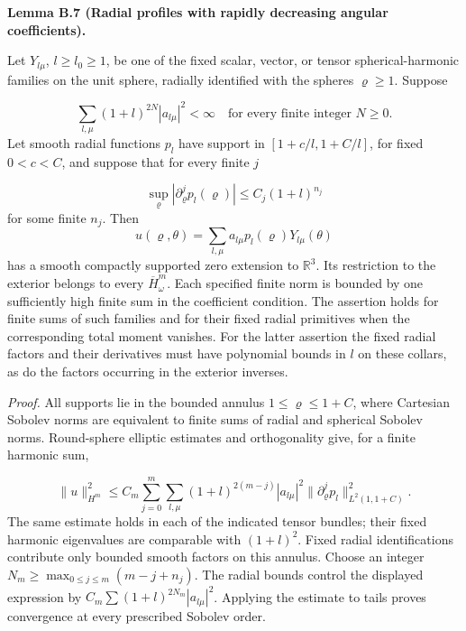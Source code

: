 \documentclass[
  english,
  11pt,
  reqno]{amsart}
\makeatletter
\newcommand{\pandocstatementheading}[1]{%
  \par\addpenalty{\@beginparpenalty}%
  \addvspace{.5\baselineskip plus .2\baselineskip minus .2\baselineskip}%
  {\normalfont\bfseries #1\par}%
  \nobreak\@afterindenttrue\@afterheading
}
\makeatother
\begin{document}
\pandocstatementheading{\leavevmode{}\label{lem:online-extension-radial-profile-regularity}Lemma B.7 (Radial profiles with rapidly decreasing angular
coefficients).}

Let \(Y_{l\mu}\), \(l\ge l_0\ge1\), be one of the fixed scalar, vector,
or tensor spherical-harmonic families on the unit sphere, radially
identified with the spheres \(\varrho\ge1\). Suppose

\label{eq:online-extension-profile-rapid-coefficients} \[
\sum_{l,\mu}(1+l)^{2N}|a_{l\mu}|^2<\infty
\quad\text{for every finite integer }N\ge0.
\] Let smooth radial functions \(p_l\) have support in
\([1+c/l,1+C/l]\), for fixed \(0<c<C\), and suppose that for every
finite \(j\)

\label{eq:online-extension-profile-radial-bounds} \[
\sup_\varrho|\partial_\varrho^jp_l(\varrho)|
\le C_j(1+l)^{n_j}
\] for some finite \(n_j\). Then \[
u(\varrho,\theta)=
\sum_{l,\mu}a_{l\mu}p_l(\varrho)Y_{l\mu}(\theta)
\] has a smooth compactly supported zero extension to \(\mathbb R^3\).
Its restriction to the exterior belongs to every
\(\overline H^m_\omega\). Each specified finite norm is bounded by one
sufficiently high finite sum in the coefficient condition. The assertion
holds for finite sums of such families and for their fixed radial
primitives when the corresponding total moment vanishes. For the latter
assertion the fixed radial factors and their derivatives must have
polynomial bounds in \(l\) on these collars, as do the factors occurring
in the exterior inverses.

\emph{Proof.} All supports lie in the bounded annulus
\(1\le\varrho\le1+C\), where Cartesian Sobolev norms are equivalent to
finite sums of radial and spherical Sobolev norms. Round-sphere elliptic
estimates and orthogonality give, for a finite harmonic sum,

\label{eq:online-extension-profile-sobolev-estimate} \[
\|u\|_{H^m}^2
\le C_m\sum_{j=0}^m\sum_{l,\mu}
(1+l)^{2(m-j)}|a_{l\mu}|^2
\|\partial_\varrho^jp_l\|_{L^2(1,1+C)}^2.
\] The same estimate holds in each of the indicated tensor bundles;
their fixed harmonic eigenvalues are comparable with \((1+l)^2\). Fixed
radial identifications contribute only bounded smooth factors on this
annulus. Choose an integer \(N_m\ge\max_{0\le j\le m}(m-j+n_j)\). The
radial bounds control the displayed expression by
\(C_m\sum(1+l)^{2N_m}|a_{l\mu}|^2\). Applying the estimate to tails
proves convergence at every prescribed Sobolev order.
\end{document}
